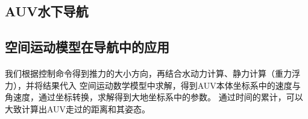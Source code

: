 \documentclass{ctexart}
\begin{document}
	\subsection{AUV水下导航}
	\subsection*{空间运动模型在导航中的应用}
	\paragraph{}我们根据控制命令得到推力的大小方向，再结合水动力计算、静力计算（重力浮力），并将结果代入
				空间运动数学模型中求解，得到AUV本体坐标系中的速度与角速度，通过坐标转换，求解得到大地坐标系中的参数。
				通过时间的累计，可以大致计算出AUV走过的距离和其姿态。
\end{document}

